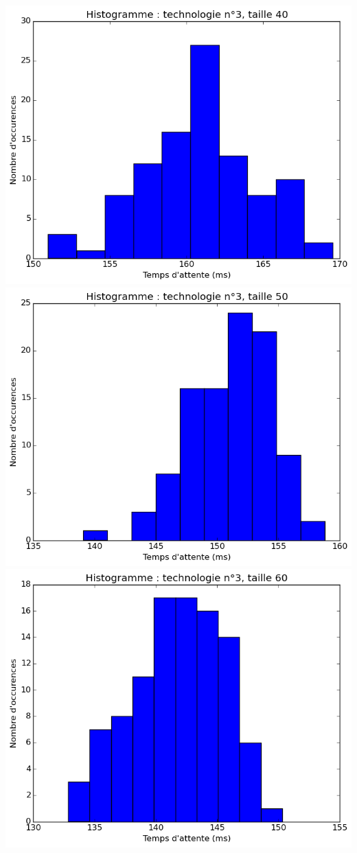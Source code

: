 \documentclass[a4paper,10pt]{article}
\begin{document}
\includegraphics[scale=0.4]{img/3-40.png}
\\
\includegraphics[scale=0.4]{img/3-50.png}
\includegraphics[scale=0.4]{img/3-60.png}
\end{document}
